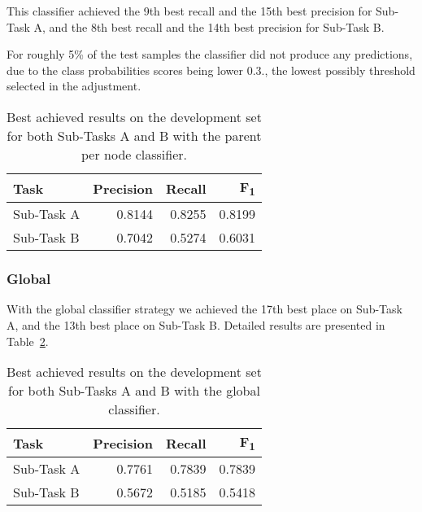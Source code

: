 \documentclass[11pt,a4paper]{article}
\begin{document}
This classifier achieved the 9th best recall and the 15th best precision for
Sub-Task A, and the 8th best recall and the 14th best precision for Sub-Task B.

For roughly 5\% of the test samples the classifier did not produce any predictions,
due to the class probabilities scores being lower 0.3., the lowest possibly threshold
selected in the adjustment.

\begin{table}[!h]
\begin{center}
\begin{tabular}{|l|r|r|r|}
\hline\centering\textbf{Task}  & \textbf{Precision} &  \textbf{Recall} &  \textbf{F\textsubscript{1}}\\
\hline
 Sub-Task A   &  0.8144 & 0.8255 & 0.8199 \\
 Sub-Task B   &  0.7042 & 0.5274 & 0.6031 \\
\hline
\end{tabular}
\end{center}
\caption{\label{local_devset-results} Best achieved results on the development
          set for both Sub-Tasks A and B with the parent per node classifier.}
\end{table}





\subsubsection{Global}

With the global classifier strategy we achieved the 17th best place on Sub-Task A,
and the 13th best place on Sub-Task B. Detailed results are presented in
Table~\ref{global_devset-results}.

\begin{table}[!h]
\begin{center}
\begin{tabular}{|l|r|r|r|}
\hline\centering\textbf{Task}  & \textbf{Precision} &  \textbf{Recall} &  \textbf{F\textsubscript{1}}\\
\hline
 Sub-Task A   &  0.7761 & 0.7839 & 0.7839 \\
 Sub-Task B   &  0.5672 & 0.5185 & 0.5418 \\
\hline
\end{tabular}
\end{center}
\caption{\label{global_devset-results} Best achieved results on the development
          set for both Sub-Tasks A and B with the global classifier.}
\end{table}
\end{document}

